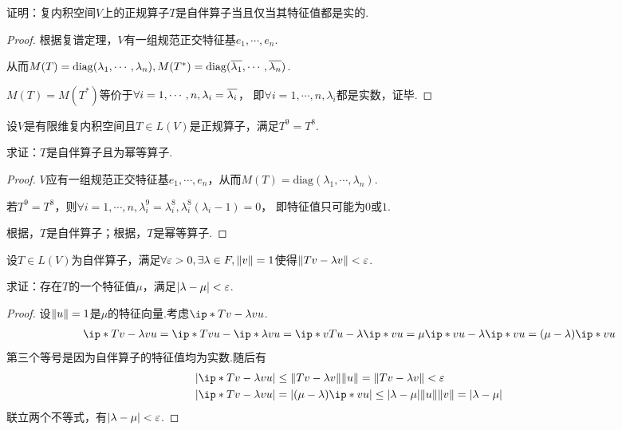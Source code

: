 \begin{problem}[6]\label{7.B.6}
    证明：复内积空间\(V\)上的正规算子\(T\)是自伴算子当且仅当其特征值都是实的.
\end{problem}

\begin{proof}
    根据复谱定理，\(V\)有一组规范正交特征基\(e_1,\cdots,e_n\).

    从而\(M(T)=\mathrm{diag}(\lambda_1,\cdots,\lambda_n),M(T^*)=\mathrm{diag}(\ol{\lambda_1},\cdots,\ol{\lambda_n})\).
    
    \(M(T)=M(T^*)\)等价于\(\forall i=1,\cdots,n,\lambda_i=\ol{\lambda_i}\)，
    即\(\forall i=1,\cdots,n,\lambda_i\)都是实数，证毕.
\end{proof}

\begin{problem}[8]\label{7.B.8}
    设\(V\)是有限维复内积空间且\(T \in L(V)\)是正规算子，满足\(T^9=T^8\).

    求证：\(T\)是自伴算子且为幂等算子.
\end{problem}

\begin{proof}
    \(V\)应有一组规范正交特征基\(e_1,\cdots,e_n\)，从而\(M(T)=\mathrm{diag}(\lambda_1,\cdots,\lambda_n)\).

    若\(T^9=T^8\)，则\(\forall i=1,\cdots,n,\lambda_i^9=\lambda_i^8,\lambda_i^8(\lambda_i-1)=0\)，
    即特征值只可能为\(0\)或\(1\).

    根据，\(T\)是自伴算子；根据，\(T\)是幂等算子.
\end{proof}

\begin{problem}[12]\label{7.B.12}
    设\(T \in L(V)\)为自伴算子，满足\(\forall \varepsilon>0,\exists \lambda \in F,\norm*{v}=1\)使得\(\norm*{Tv-\lambda v}<\varepsilon\).

    求证：存在\(T\)的一个特征值\(\mu\)，满足\(\abs*{\lambda-\mu}<\varepsilon\).
\end{problem}

\begin{proof}
    设\(\norm*{u}=1\)是\(\mu\)的特征向量.考虑\(\ip*{Tv-\lambda v}{u}\).
    \begin{align*}
        \ip*{Tv-\lambda v}{u}=\ip*{Tv}{u}-\ip*{\lambda v}{u}=\ip*{v}{Tu}-\lambda \ip*{v}{u}
        =\mu \ip*{v}{u}-\lambda \ip*{v}{u}=(\mu-\lambda)\ip*{v}{u}
    \end{align*}
    第三个等号是因为自伴算子的特征值均为实数.随后有
    \begin{align*}
        &\abs*{\ip*{Tv-\lambda v}{u}} \leq \norm*{Tv-\lambda v}\norm*{u}=\norm*{Tv-\lambda v}<\varepsilon \\
        &\abs*{\ip*{Tv-\lambda v}{u}}=\abs*{(\mu-\lambda)\ip*{v}{u}} \leq \abs*{\lambda-\mu}\norm*{u}\norm*{v}=\abs*{\lambda-\mu}
    \end{align*}
    联立两个不等式，有\(\abs*{\lambda-\mu}<\varepsilon\).
\end{proof}


